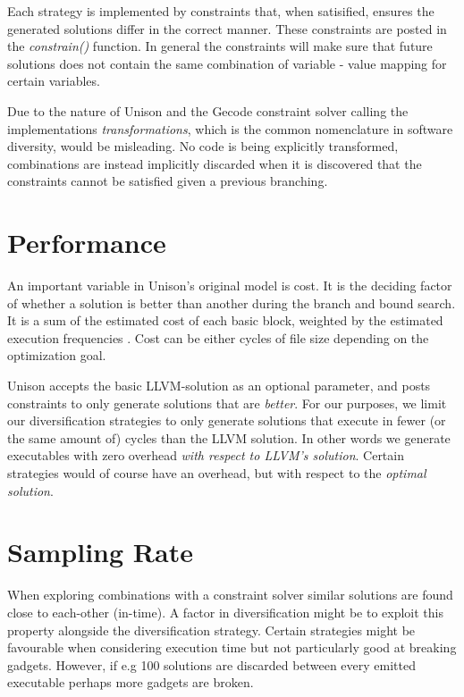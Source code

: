 Each strategy is implemented by constraints that, when satisified, ensures the
generated solutions differ in the correct manner. These constraints are posted in the
\textit{constrain()} function. In general the constraints will make sure that future
solutions does not contain the same combination of variable - value mapping for certain
variables.

Due to the nature of Unison and the Gecode constraint solver calling the implementations
\textit{transformations}, which is the common nomenclature in software diversity, would be
misleading. No code is being explicitly transformed, combinations are instead implicitly
discarded when it is discovered that the constraints cannot be satisfied given a previous
branching.




\section{Performance}
\label{sec:performance}

An important variable in Unison's original model is cost. It is the deciding factor of
whether a solution is better than another during the branch and bound search. It is a sum
of the estimated cost of each basic block, weighted by the estimated execution frequencies
\cite{unison-docs}. Cost can be either cycles of file size depending on the optimization
goal.

Unison accepts the basic LLVM-solution as an optional parameter, and posts constraints to
only generate solutions that are \textit{better}. For our purposes, we limit our
diversification strategies to only generate solutions that execute in fewer (or the same
amount of) cycles than the LLVM solution. In other words we generate executables with zero
overhead \textit{with respect to LLVM's solution}.  Certain strategies would of course
have an overhead, but with respect to the \textit{optimal solution}.

\section{Sampling Rate}
When exploring combinations with a constraint solver similar solutions are found close to
each-other (in-time). A factor in diversification might be to exploit this property
alongside the diversification strategy. Certain strategies might be favourable when
considering execution time but not particularly good at breaking gadgets. However, if
e.g 100 solutions are discarded between every emitted executable perhaps more gadgets are
broken.

